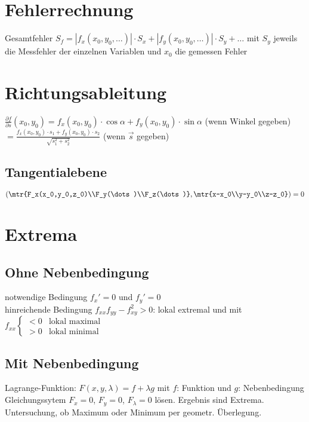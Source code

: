 \documentclass{scrreprt}
\begin{document}
\section{Fehlerrechnung}
Gesamtfehler $S_f=|f_x(x_0,y_0,\dots)|\cdot S_x+|f_y(x_0,y_0,\dots)|\cdot S_y+\dots$ mit $S_y$ jeweils die Messfehler der einzelnen Variablen und $x_0$ die gemessen Fehler

\section{Richtungsableitung}
$\frac{\partial f}{\partial s} (x_0,y_0) = f_x(x_0,y_0) \cdot \cos \alpha + f_y (x_0,y_0) \cdot \sin \alpha$  (wenn Winkel gegeben)\\
$= \frac{f_x(x_0,y_0) \cdot s_1+f_y (x_0,y_0) \cdot s_2}{\sqrt{s_1^2+s_2^2}}$ (wenn $\vec{s}$ gegeben)

\subsection{Tangentialebene}
$\left(\mtr{F_x(x_0,y_0,z_0)\\F_y(\dots)\\F_z(\dots)}, \mtr{x-x_0\\y-y_0\\z-z_0}\right) = 0$

\section{Extrema}
\subsection{Ohne Nebenbedingung}
notwendige Bedingung $f_x'=0$ und $f_y'=0$\\
hinreichende Bedingung $f_{xx}f_{yy}-f_{xy}^2>0$: lokal extremal und mit $f_{xx}\begin{cases}
<0 & \text{lokal maximal}\\
>0 & \text{lokal minimal}
\end{cases}$
\subsection{Mit Nebenbedingung}
Lagrange-Funktion: $F(x,y,\lambda)=f+\lambda g$ mit $f$: Funktion und $g$: Nebenbedingung\\
Gleichungssytem $F_x=0$, $F_y=0$, $F_\lambda =0$ lösen. Ergebnis sind Extrema.\\
Untersuchung, ob Maximum oder Minimum per geometr. Überlegung.
\end{document}
